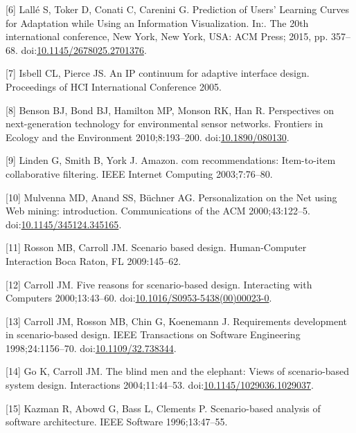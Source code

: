 \documentclass[]{article}
\begin{document}
\hypertarget{ref-Lalle:2015hfa}{}
{[}6{]} Lallé S, Toker D, Conati C, Carenini G. Prediction of Users'
Learning Curves for Adaptation while Using an Information Visualization.
In:. The 20th international conference, New York, New York, USA: ACM
Press; 2015, pp. 357--68.
doi:\href{https://doi.org/10.1145/2678025.2701376}{10.1145/2678025.2701376}.

\hypertarget{ref-Anonymous:VabnjUVa}{}
{[}7{]} Isbell CL, Pierce JS. An IP continuum for adaptive interface
design. Proceedings of HCI International Conference 2005.

\hypertarget{ref-Benson:2010jn}{}
{[}8{]} Benson BJ, Bond BJ, Hamilton MP, Monson RK, Han R. Perspectives
on next-generation technology for environmental sensor networks.
Frontiers in Ecology and the Environment 2010;8:193--200.
doi:\href{https://doi.org/10.1890/080130}{10.1890/080130}.

\hypertarget{ref-linden2003amazon}{}
{[}9{]} Linden G, Smith B, York J. Amazon. com recommendations:
Item-to-item collaborative filtering. IEEE Internet Computing
2003;7:76--80.

\hypertarget{ref-Mulvenna:2000iv}{}
{[}10{]} Mulvenna MD, Anand SS, Büchner AG. Personalization on the Net
using Web mining: introduction. Communications of the ACM
2000;43:122--5.
doi:\href{https://doi.org/10.1145/345124.345165}{10.1145/345124.345165}.

\hypertarget{ref-rosson2009scenario}{}
{[}11{]} Rosson MB, Carroll JM. Scenario based design. Human-Computer
Interaction Boca Raton, FL 2009:145--62.

\hypertarget{ref-Carroll:1999hh}{}
{[}12{]} Carroll JM. Five reasons for scenario-based design. Interacting
with Computers 2000;13:43--60.
doi:\href{https://doi.org/10.1016/S0953-5438(00)00023-0}{10.1016/S0953-5438(00)00023-0}.

\hypertarget{ref-Anonymous:MZBQUkQZ}{}
{[}13{]} Carroll JM, Rosson MB, Chin G, Koenemann J. Requirements
development in scenario-based design. IEEE Transactions on Software
Engineering 1998;24:1156--70.
doi:\href{https://doi.org/10.1109/32.738344}{10.1109/32.738344}.

\hypertarget{ref-mcdonaldm:2004us}{}
{[}14{]} Go K, Carroll JM. The blind men and the elephant: Views of
scenario-based system design. Interactions 2004;11:44--53.
doi:\href{https://doi.org/10.1145/1029036.1029037}{10.1145/1029036.1029037}.

\hypertarget{ref-Anonymous:P3P38N9F}{}
{[}15{]} Kazman R, Abowd G, Bass L, Clements P. Scenario-based analysis
of software architecture. IEEE Software 1996;13:47--55.
\end{document}
